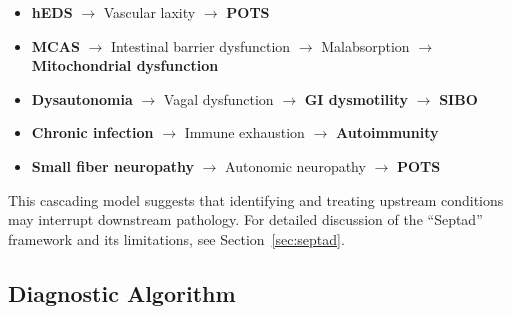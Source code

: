 \begin{itemize}
    \item \textbf{hEDS} $\rightarrow$ Vascular laxity $\rightarrow$ \textbf{POTS}
    \item \textbf{MCAS} $\rightarrow$ Intestinal barrier dysfunction $\rightarrow$ Malabsorption $\rightarrow$ \textbf{Mitochondrial dysfunction}
    \item \textbf{Dysautonomia} $\rightarrow$ Vagal dysfunction $\rightarrow$ \textbf{GI dysmotility} $\rightarrow$ \textbf{SIBO}
    \item \textbf{Chronic infection} $\rightarrow$ Immune exhaustion $\rightarrow$ \textbf{Autoimmunity}
    \item \textbf{Small fiber neuropathy} $\rightarrow$ Autonomic neuropathy $\rightarrow$ \textbf{POTS}
\end{itemize}

This cascading model suggests that identifying and treating upstream conditions may interrupt downstream pathology. For detailed discussion of the ``Septad'' framework and its limitations, see Section~\ref{sec:septad}.

\subsection{Diagnostic Algorithm}


